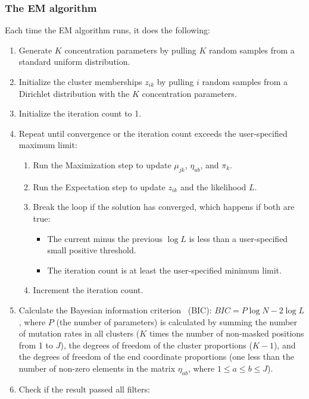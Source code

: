 \documentclass[11pt]{article}
\begin{document}
\subsubsection{The EM algorithm}
\label{em-algorithm}

Each time the EM algorithm runs, it does the following:
\begin{enumerate}
    \item Generate $K$ concentration parameters by pulling $K$ random samples from a standard uniform distribution.
    \item Initialize the cluster memberships $z_{ik}$ by pulling $i$ random samples from a Dirichlet distribution with the $K$ concentration parameters.
    \item Initialize the iteration count to 1.
    \item Repeat until convergence or the iteration count exceeds the user-specified maximum limit:
    \begin{enumerate}
        \item Run the Maximization step to update $\mu_{jk}$, $\eta_{ab}$, and $\pi_k$.
        \item Run the Expectation step to update $z_{ik}$ and the likelihood $L$.
        \item Break the loop if the solution has converged, which happens if both are true:
        \begin{itemize}
            \item The current minus the previous $\log{L}$ is less than a user-specified small positive threshold.
            \item The iteration count is at least the user-specified minimum limit.
        \end{itemize}
        \item Increment the iteration count.
    \end{enumerate}
    \item Calculate the Bayesian information criterion~\cite{Schwarz1978} (BIC): $BIC = P\log{N} - 2\log{L}$, where $P$ (the number of parameters) is calculated by summing the number of mutation rates in all clusters ($K$ times the number of non-masked positions from 1 to $J$), the degrees of freedom of the cluster proportions ($K - 1$), and the degrees of freedom of the end coordinate proportions (one less than the number of non-zero elements in the matrix $\eta_{ab}$, where $1 \le a \le b \le J$).
    \item Check if the result passed all filters:
    \begin{description}

\end{description}
\end{enumerate}
\end{document}
